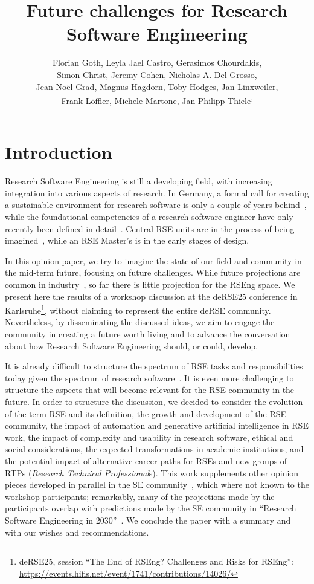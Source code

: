 \documentclass{eceasst}
\title{Future challenges for Research Software Engineering} %
\author{
Florian Goth\authorOrcid{0000-0003-2707-4790}\authorRef{1},
Leyla Jael Castro\authorOrcid{0000-0003-3986-0510}\authorRef{2},
Gerasimos Chourdakis\authorOrcid{0000-0002-3977-1385}\authorRef{3},
\texorpdfstring{\\}{} %
Simon Christ\authorOrcid{0000-0002-5866-1472}\authorRef{4},
Jeremy Cohen\authorOrcid{0000-0003-4312-2537}\authorRef{5},
Nicholas A. Del Grosso\thinspace\authorRef{6},
\texorpdfstring{\\}{} %
Jean-Noël Grad\authorOrcid{0000-0002-5821-4912}\authorRef{7},
Magnus Hagdorn\authorOrcid{0000-0002-5076-4864}\authorRef{8},
Toby Hodges\authorOrcid{0000-0003-1766-456X}\authorRef{9},
Jan Linxweiler\authorOrcid{0000-0002-2755-5087}\authorRef{10},
\texorpdfstring{\\}{} %
Frank Löffler\authorOrcid{0000-0001-6643-6323}\authorRef{11},
Michele Martone\authorOrcid{0000-0003-3239-8554}\authorRef{12},
Jan Philipp Thiele\authorOrcid{0000-0002-8901-6660}\authorRef{10}\textsuperscript{,}\authorRef{13}
} %
\institute{%
\autlabel{1} Institut für theoretische Physik 1, University of Würzburg, 97074, Würzburg, Germany\\
\autlabel{2} ZB MED Information Centre for Life Sciences, Cologne, Germany\\
\autlabel{3} Institute for Parallel and Distributed Systems, University of Stuttgart, Stuttgart, Germany\\
\autlabel{4} Leibniz University Hannover, Department of Cell Biology and Biophysics, Computational Biology, Germany\\
\autlabel{5} Imperial College London, London, UK\\
\autlabel{6} Institute for Experimental Epileptology and Cognition Research, Uniklinikum Bonn, Germany\\
\autlabel{7} Institute for Computational Physics, University of Stuttgart, Germany\\
\autlabel{8} Geschäftsbereich IT, Charité Universitätsmedizin Berlin, Germany\\
\autlabel{9} The Carpentries, USA\\
\autlabel{10} Technische Universität Braunschweig, Germany\\
\autlabel{11} Michael Stifel Center Jena {\&} Friedrich Schiller University Jena, Germany\\
\autlabel{12} Independent researcher, Germany\\
\autlabel{13} Weierstrass Institute, Berlin, Germany;
              Leibniz University Hannover, Institute of Applied Mathematics, Scientific Computing, Hannover, Germany\\
}
\begin{document}
\maketitle

\section{Introduction}

Research Software Engineering is still a developing field,
with increasing integration into various aspects of research.
In Germany, a formal call for creating a sustainable environment for research software
is only a couple of years behind~\cite{Anzt2021},
while the foundational competencies of a research software engineer have only recently been defined in detail~\cite{Goth2024}. Central RSE units are in the process of being imagined~\cite{Kempf2025-draft},
while an RSE Master's is in the early stages of design. 

In this opinion paper, we try to imagine the state of our field
and community in the mid-term future, focusing on future challenges.
While future projections are common in industry~\cite{Gartner2025},
so far there is little projection for the RSEng space.
We present here the results of a workshop discussion at the
deRSE25 conference in Karlsruhe\footnote{deRSE25, session ``The End of {RSEng}?
Challenges and Risks for {RSEng}'': \url{https://events.hifis.net/event/1741/contributions/14026/}},
without claiming to represent the entire deRSE community.
Nevertheless, by disseminating the discussed ideas,
we aim to engage the community in creating a future worth living
and to advance the conversation about how Research Software Engineering should, or could, develop.

It is already difficult to structure the spectrum of RSE tasks and responsibilities
today given the spectrum of research software~\cite{Hasselbring2024}.
It is even more challenging to structure the aspects that will become relevant for the RSE community in the future.
In order to structure the discussion, we decided to consider
the evolution of the term RSE and its definition,
the growth and development of the RSE community,
the impact of automation and generative artificial intelligence in RSE work,
the impact of complexity and usability in research software,
ethical and social considerations,
the expected transformations in academic institutions,
and the potential impact of alternative career paths for RSEs
and new groups of RTPs (\emph{Research Technical Professional}s).
This work supplements other opinion pieces developed in parallel
in the SE community~\cite{ChueHong2025,Sochat2024Infra,Bencomo2024AEBoK,OliveiraJr2024,Druskat2025},
which where not known to the workshop participants; remarkably,
many of the projections made by the participants overlap with predictions made
by the SE community in ``Research Software Engineering in 2030''~\cite{Katz2023}.
We conclude the paper with a summary and with our wishes and recommendations.
\end{document}
